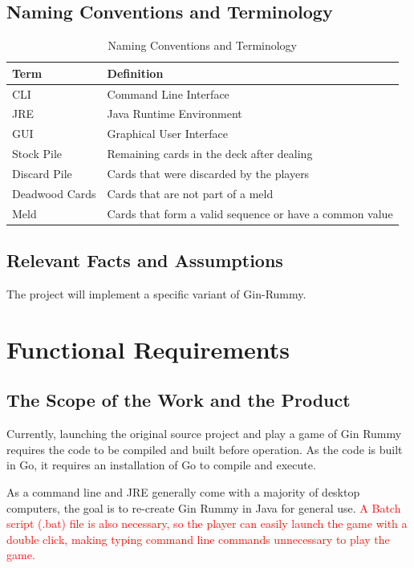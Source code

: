 \documentclass[12pt, titlepage]{article}
\begin{document}
\subsection{Naming Conventions and Terminology}
\begin{table}[H]
\caption{Naming Conventions and Terminology}
    \centering
    \begin{tabular}{ |p{5cm}|p{7.5cm}| }
    \hline
    \textbf{Term} & \textbf{Definition} \\
    \hline
    CLI & Command Line Interface \\
    \hline
    JRE & Java Runtime Environment \\
    \hline
    GUI & Graphical User Interface \\
    \hline
    Stock Pile & Remaining cards in the deck after dealing \\
    \hline
    Discard Pile & Cards that were discarded by the players \\
    \hline
    Deadwood Cards & Cards that are not part of a meld \\
    \hline
    Meld & Cards that form a valid sequence or have a common value \\
    \hline
    \end{tabular}
\end{table}

\subsection{Relevant Facts and Assumptions}

The project will implement a specific variant of Gin-Rummy. \cite{ginRuleSet}

\section{Functional Requirements}
\subsection{The Scope of the Work and the Product}
Currently, launching the original source project and play a game of Gin Rummy requires the code to be compiled and built before operation. As the code is built in Go, it requires an installation of Go to compile and execute. \cite{ogSource}

As a command line and JRE generally come with a majority of desktop computers, the goal is to re-create Gin Rummy in Java for general use.
\textcolor{red}{A Batch script (.bat) file is also necessary, so the player can easily launch the game with a double click, making typing command line commands unnecessary to play the game.}
\end{document}
